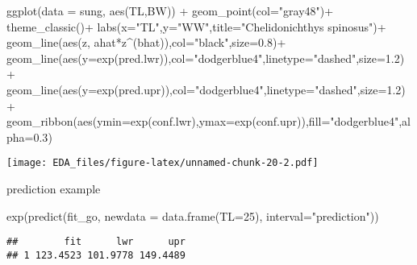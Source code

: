 \documentclass[
]{article}
\newenvironment{Shaded}{\begin{snugshade}}{\end{snugshade}}
\newcommand{\AttributeTok}[1]{\textcolor[rgb]{0.77,0.63,0.00}{#1}}
\newcommand{\DecValTok}[1]{\textcolor[rgb]{0.00,0.00,0.81}{#1}}
\newcommand{\FloatTok}[1]{\textcolor[rgb]{0.00,0.00,0.81}{#1}}
\newcommand{\FunctionTok}[1]{\textcolor[rgb]{0.00,0.00,0.00}{#1}}
\newcommand{\NormalTok}[1]{#1}
\newcommand{\SpecialCharTok}[1]{\textcolor[rgb]{0.00,0.00,0.00}{#1}}
\newcommand{\StringTok}[1]{\textcolor[rgb]{0.31,0.60,0.02}{#1}}
\begin{document}
\begin{Shaded}
\begin{Highlighting}[]
\FunctionTok{ggplot}\NormalTok{(}\AttributeTok{data =}\NormalTok{ sung, }\FunctionTok{aes}\NormalTok{(TL,BW)) }\SpecialCharTok{+} \FunctionTok{geom\_point}\NormalTok{(}\AttributeTok{col=}\StringTok{"gray48"}\NormalTok{)}\SpecialCharTok{+} 
  \FunctionTok{theme\_classic}\NormalTok{()}\SpecialCharTok{+} \FunctionTok{labs}\NormalTok{(}\AttributeTok{x=}\StringTok{"TL"}\NormalTok{,}\AttributeTok{y=}\StringTok{"WW"}\NormalTok{,}\AttributeTok{title=}\StringTok{"Chelidonichthys spinosus"}\NormalTok{)}\SpecialCharTok{+}
  \FunctionTok{geom\_line}\NormalTok{(}\FunctionTok{aes}\NormalTok{(z, ahat}\SpecialCharTok{*}\NormalTok{z}\SpecialCharTok{\^{}}\NormalTok{(bhat)),}\AttributeTok{col=}\StringTok{"black"}\NormalTok{,}\AttributeTok{size=}\FloatTok{0.8}\NormalTok{)}\SpecialCharTok{+}
  \FunctionTok{geom\_line}\NormalTok{(}\FunctionTok{aes}\NormalTok{(}\AttributeTok{y=}\FunctionTok{exp}\NormalTok{(pred.lwr)),}\AttributeTok{col=}\StringTok{"dodgerblue4"}\NormalTok{,}\AttributeTok{linetype=}\StringTok{"dashed"}\NormalTok{,}\AttributeTok{size=}\FloatTok{1.2}\NormalTok{)}\SpecialCharTok{+} 
  \FunctionTok{geom\_line}\NormalTok{(}\FunctionTok{aes}\NormalTok{(}\AttributeTok{y=}\FunctionTok{exp}\NormalTok{(pred.upr)),}\AttributeTok{col=}\StringTok{"dodgerblue4"}\NormalTok{,}\AttributeTok{linetype=}\StringTok{"dashed"}\NormalTok{,}\AttributeTok{size=}\FloatTok{1.2}\NormalTok{)}\SpecialCharTok{+}
  \FunctionTok{geom\_ribbon}\NormalTok{(}\FunctionTok{aes}\NormalTok{(}\AttributeTok{ymin=}\FunctionTok{exp}\NormalTok{(conf.lwr),}\AttributeTok{ymax=}\FunctionTok{exp}\NormalTok{(conf.upr)),}\AttributeTok{fill=}\StringTok{"dodgerblue4"}\NormalTok{,}\AttributeTok{alpha=}\FloatTok{0.3}\NormalTok{)}
\end{Highlighting}
\end{Shaded}

\texttt{[image: EDA\_files/figure-latex/unnamed-chunk-20-2.pdf]}

prediction example

\begin{Shaded}
\begin{Highlighting}[]
\FunctionTok{exp}\NormalTok{(}\FunctionTok{predict}\NormalTok{(fit\_go, }\AttributeTok{newdata =} \FunctionTok{data.frame}\NormalTok{(}\AttributeTok{TL=}\DecValTok{25}\NormalTok{), }\AttributeTok{interval=}\StringTok{"prediction"}\NormalTok{)) }
\end{Highlighting}
\end{Shaded}

\begin{verbatim}
##        fit      lwr      upr
## 1 123.4523 101.9778 149.4489
\end{verbatim}
\end{document}
